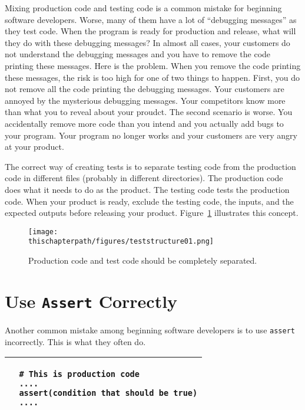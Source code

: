Mixing production code and testing code is a common mistake for
beginning software developers. Worse, many of them have a lot of
``debugging messages'' as they test  code. When the program is
ready for production and release, what will they do with these
debugging messages?  In almost all cases, your customers do not
understand the debugging messages and you have to remove the code
printing these messages.  Here is the problem. When you remove the
code printing these messages, the risk is too high for one of two
things to happen. First, you do not remove all the code printing the
debugging messages.  Your customers are annoyed by the mysterious
debugging messages. Your competitors know more than what you to reveal
about your proudct.  The second scenario is worse.  You accidentally
remove more code than you intend and you actually add bugs to your
program.  Your program no longer works and your customers are very
angry at your product.

The correct way of creating tests is to separate testing code from the
production code in different files (probably in different
directories).  The production code does what it needs to do
as the product. The
testing code tests the production code.  When your product is ready,
exclude the testing code, the inputs, and the expected outputs before
releasing your product.  Figure~\ref{fig:teststructure01} illustrates
this concept.

\begin{figure}[h] \centering
{\texttt{[image: \\thischapterpath/figures/teststructure01.png]}}
\caption{Production code and test code should be completely separated.}
\label{fig:teststructure01}
\end{figure}

\section{Use {\tt Assert} Correctly}

Another common mistake among beginning software developers is to use
{\tt assert} incorrectly. This is what they often do.


\vspace{0.2in}

\noindent
\begin{tabular}{|p{5in}|}\hline
\begin{verbatim}
  # This is production code
  ....
  assert(condition that should be true)
  ....
\end{verbatim}
\\ \hline
\end{tabular}
\vspace{0.2in}

